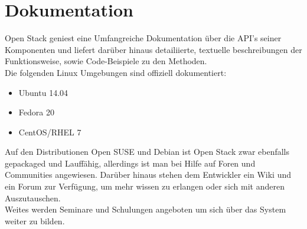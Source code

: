 \documentclass[a4paper,nochapterprefix,ngerman,12pt]{scrreprt}
\begin{document}
\section{Dokumentation}
Open Stack geniest eine Umfangreiche Dokumentation über die API's seiner Komponenten und liefert darüber hinaus detailiierte, textuelle beschreibungen der Funktionsweise, sowie Code-Beispiele zu den Methoden.\\
Die folgenden Linux Umgebungen sind offiziell dokumentiert:
\begin{itemize}
	\item Ubuntu 14.04
	\item Fedora 20
	\item CentOS/RHEL 7
\end{itemize}
Auf den Distributionen Open SUSE und Debian ist Open Stack zwar ebenfalls gepackaged und Lauffähig, allerdings ist man bei Hilfe auf Foren und Communities angewiesen.
Darüber hinaus stehen dem Entwickler ein Wiki und ein Forum zur Verfügung, um mehr wissen zu erlangen oder sich mit anderen Auszutauschen.\\
Weites werden Seminare und Schulungen angeboten um sich über das System weiter zu bilden. 
\end{document}

